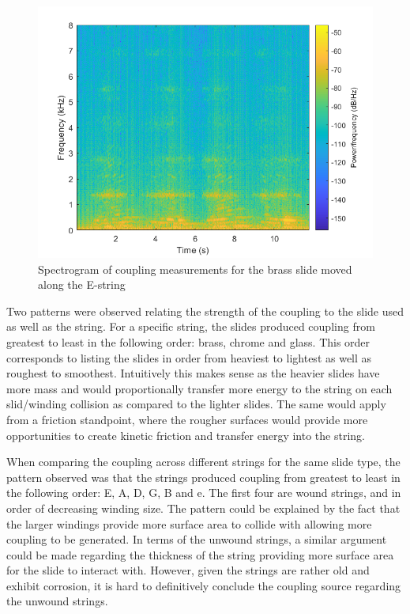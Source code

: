\documentclass[../main.tex]{subfiles}
\begin{document}
\begin{figure}[h]
    \centering
    \includegraphics[scale=.75]{./images/plots/EBrassCoupling.png}
    \caption{Spectrogram of coupling measurements for the brass slide moved along the E-string}
    \label{fig:L2CSpectrum}
\end{figure}

Two patterns were observed relating the strength of the coupling to the slide used as well as the string. For a specific string, the slides produced coupling from greatest to least in the following order: brass, chrome and glass. This order corresponds to listing the slides in order from heaviest to lightest as well as roughest to smoothest. Intuitively this makes sense as the heavier slides have more mass and would proportionally transfer more energy to the string on each slid/winding collision as compared to the lighter slides. The same would apply from a friction standpoint, where the rougher surfaces would provide more opportunities to create kinetic friction and transfer energy into the string.

When comparing the coupling across different strings for the same slide type, the pattern observed was that the strings produced coupling from greatest to least in the following order: E, A, D, G, B and e. The first four are wound strings, and in order of decreasing winding size. The pattern could be explained by the fact that the larger windings provide more surface area to collide with allowing more coupling to be generated. In terms of the unwound strings, a similar argument could be made regarding the thickness of the string providing more surface area for the slide to interact with. However, given the strings are rather old and exhibit corrosion, it is hard to definitively conclude the coupling source regarding the unwound strings.
\end{document}
